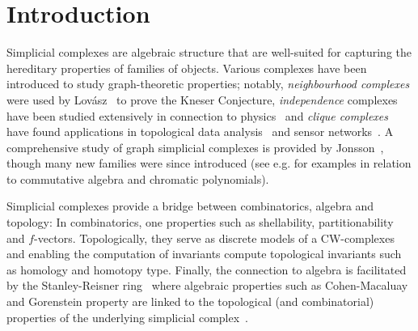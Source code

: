 \documentclass[a4paper, v2021]{lipics-v2021}
\theoremstyle{plain}
\theoremstyle{definition}
\begin{document}
\begin{abstract}
Our approach utilizes K\"{o}nig's theorem to decompose the complex into manageable components, whose homotopy types are easy to understand. This then enables an inductive proof based on the decomposition and standard tools of algebraic topology. Finally, we utilize Alexander duality to connect our results to the study of total-$k$-cut complexes, generalizing recent results concerning the homotopy types of total-$k$-cut complexes for grid graphs.






\end{abstract}
\newpage
\section{Introduction}
Simplicial complexes are algebraic structure that are well-suited for capturing the hereditary properties of families of objects. Various complexes have been introduced to study graph-theoretic properties; notably, \emph{neighbourhood complexes} were used by Lov{\'a}sz~\cite{Lovasz78} to prove the Kneser Conjecture, \emph{independence} complexes have been studied extensively in connection to physics~\cite{fendleySV2003} and \emph{clique complexes} have found applications in topological data analysis~\cite{GiustiPCI2015,ReimannNSLMH2017} and sensor networks~\cite{desilvaG2007}. A comprehensive study of graph simplicial complexes is provided by Jonsson~\cite{Jonsson08}, though many new families were since introduced (see e.g. \cite{BayerDJRSX24, white2016} for examples in relation to commutative algebra and chromatic polynomials).


Simplicial complexes provide a bridge between combinatorics, algebra and topology:
In combinatorics, one properties such as shellability, partitionability and $f$-vectors. Topologically, they serve as discrete models of a CW-complexes and enabling the computation of invariants compute topological invariants such as homology and homotopy type. Finally, the connection to algebra is facilitated by the Stanley-Reisner ring~\cite{reisner1976} where algebraic properties such as Cohen-Macaluay and Gorenstein property are  linked to the topological (and combinatorial) properties of the underlying simplicial complex~\cite{reisner1976,bjorner1980}. 
\end{document}
